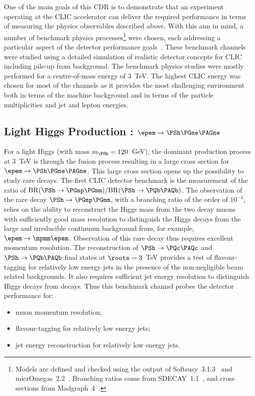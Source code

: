 One of the main goals of this CDR is to demonstrate that an
experiment operating at the CLIC accelerator can deliver the required performance in
terms of measuring the physics observables described above. With this aim in
mind, a number of benchmark physics processes\footnote{Models are defined and checked using the output of
Softsusy~3.1.3~\cite{Allanach:2001kg} and micrOmegas~2.2~\cite{Belanger:2008sj}. Branching ratios come from SDECAY~1.1~\cite{Muhlleitner:2004mka}, and
cross sections from Madgraph~4~\cite{Alwall:2007st}.} were chosen, each addressing
a particular aspect of the detector performance goals~\cite{lcd:2011-016}. These benchmark channels
were studied using a detailed \geant simulation of realistic detector concepts
for CLIC including pile-up from \gghadrons background.
The benchmark physics studies were mostly performed for a centre-of-mass energy
of 3~TeV. The highest CLIC energy was chosen for most of the channels as it provides the 
most challenging environment both in terms of the machine background and in terms of
the particle multiplicities and jet and lepton energies. 


\subsection{Light Higgs Production \texorpdfstring{: $\epem\rightarrow
    \PSh \PGne\PAGne$}{}}

For a light Higgs (with mass $m_{\PSh} = 120$~GeV), the dominant production
process at 3~TeV is through the \ww fusion process resulting in a large cross
section for $\epem \rightarrow \PSh \PGne \PAGne$. This large cross section opens
up the possibility to study rare decays. The first CLIC detector benchmark is
the measurement of the ratio of
$\mathrm{BR}(\PSh\rightarrow\PGmp\PGmm)/\mathrm{BR}(\PSh\rightarrow\PQb\PAQb)$. The observation of
the rare decay $\PSh\rightarrow\PGmp\PGmm$, with a branching ratio of the order of
$10^{-4}$, relies on the ability to reconstruct the Higgs mass from
the two decay muons with sufficiently good mass resolution to distinguish the
Higgs decays from the large and irreducible continuum background from, for
example, $\epem \rightarrow \mpmm\epem$.
Observation of
this rare decay thus requires excellent momentum resolution. The reconstruction
of  $\PSh\rightarrow\PQc\PAQc$ and $\PSh\rightarrow \PQb\PAQb$ final states at
$\roots = 3$~TeV provides a test of flavour-tagging for relatively low energy jets 
in the presence of the non-negligible beam related
backgrounds. It also requires sufficient jet energy resolution to distinguish Higgs
decays from \PZ decays. 
Thus this benchmark channel probes the detector
performance for:
\begin{itemize}
   \item muon momentum resolution;
   \item flavour-tagging for relatively low energy jets;
   \item jet energy reconstruction for relatively low energy jets.
\end{itemize}


